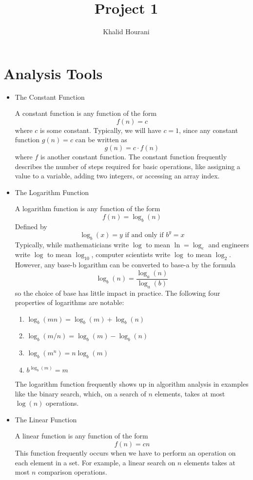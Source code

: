 \documentclass[a4paper]{article}
\title{Project 1}
\author{Khalid Hourani}
\begin{document}
\maketitle
\section{Analysis Tools}
\begin{itemize}
  \item The Constant Function 
  
  A constant function is any function of the form \[f(n) = c\] where $c$ is some constant. Typically, we will have $c=1$, since any constant function $g(n) = c$ can be written as \[g(n) = c \cdot f(n)\] where $f$ is another constant function. The constant function frequently describes the number of steps required for basic operations, like assigning a value to a variable, adding two integers, or accessing an array index. 
  
  \item The Logarithm Function
  
  A logarithm function is any function of the form \[f(n)=\log_b(n)\] Defined by \[\log_b(x)=y\text{ if and only if } b^y=x\] Typically, while mathematicians write $\log$ to mean $\ln=\log_e$ and engineers write $\log$ to mean $\log_{10}$, computer scientists write $\log$ to mean $\log_2$. However, any base-b logarithm can be converted to base-a by the formula \[\log_b(n)=\frac{\log_a(n)}{\log_a(b)}\] so the choice of base has little impact in practice. The following four properties of logarithms are notable: 
  \begin{enumerate}
  \item $\log_b(mn) = \log_b(m)+\log_b(n)$
  \item $\log_b(m/n) = \log_b(m) - \log_b(n)$
  \item $\log_b(m^n) = n\log_b(m)$
  \item $b^{\log_b(m)} = m$
  \end{enumerate}
  
  The logarithm function frequently shows up in algorithm analysis in examples like the binary search, which, on a search of $n$ elements, takes at most $\log(n)$ operations.
  \item The Linear Function
  
  A linear function is any function of the form \[f(n)=cn\] This function frequently occurs when we have to perform an operation on each element in a set. For example, a linear search on $n$ elements takes at most $n$ comparison operations.
  

\end{itemize}
\end{document}
